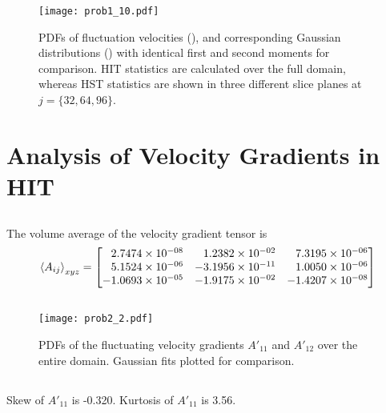 \documentclass[11pt]{article}
\begin{document}
\begin{figure}[t]
\centering
\texttt{[image: prob1\_10.pdf]}
\\[6pt]
\caption{PDFs of fluctuation velocities (), and corresponding Gaussian distributions () with identical first and second moments for comparison. HIT statistics are calculated over the full domain, whereas HST statistics are shown in three different slice planes at $j = \{32,64,96\}$.}
\label{fig:prob_1_10_fluctuation_pdfs}
\end{figure}

\section{Analysis of Velocity Gradients in HIT}

\subsection{}

The volume average of the velocity gradient tensor is
\[
\expectation{A_{ij}}_{xyz} =
\begin{bmatrix*}[r]
 2.7474\e{-08} &  1.2382\e{-02} &  7.3195\e{-06} \\
 5.1524\e{-06} & -3.1956\e{-11} &  1.0050\e{-06} \\
-1.0693\e{-05} & -1.9175\e{-02} & -1.4207\e{-08}
\end{bmatrix*}
\]

\subsection{}

\begin{figure}[t]
\centering
\texttt{[image: prob2\_2.pdf]}
\\[6pt]
\caption{PDFs of the fluctuating velocity gradients $A'_{11}$ and $A'_{12}$ over the entire domain. Gaussian fits plotted for comparison.}
\label{fig:prob_2_2_AijPrime_PDFs}
\end{figure}

\subsection{}

Skew of $A'_{11}$ is -0.320. Kurtosis of $A'_{11}$ is 3.56.

\subsection{}
\end{document}
